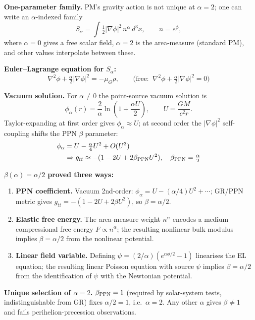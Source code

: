 \documentclass[10pt,twocolumn]{article}
\begin{document}
\textbf{One-parameter family.}
PM's gravity action is not unique at $\alpha=2$; one can write an
$\alpha$-indexed family
\[
  S_\alpha = \int \tfrac{1}{2}|\nabla\phi|^2\, n^\alpha\, d^3x,
  \qquad n=e^\phi,
\]
where $\alpha=0$ gives a free scalar field, $\alpha=2$ is the area-measure
(standard PM), and other values interpolate between these.

\textbf{Euler--Lagrange equation for $S_\alpha$:}
\[
  \nabla^2\phi + \tfrac{\alpha}{2}|\nabla\phi|^2 = -\mu_G\rho, \qquad
  \text{(free: }\ \nabla^2\phi + \tfrac{\alpha}{2}|\nabla\phi|^2 = 0\text{)}
\]

\textbf{Vacuum solution.}
For $\alpha\neq 0$ the point-source vacuum solution is
\[
  \phi_\alpha(r) = \frac{2}{\alpha}\ln\!\left(1+\frac{\alpha U}{2}\right),
  \qquad U = \frac{GM}{c^2 r}.
\]
Taylor-expanding at first order gives $\phi_\alpha \approx U$; at second order
the $|\nabla\phi|^2$ self-coupling shifts the PPN $\beta$ parameter:
\begin{align*}
  \phi_\alpha &= U - \tfrac{\alpha}{4}U^2 + O(U^3) \\
  &\Rightarrow g_{tt} \approx -(1 - 2U + 2\beta_{\rm PPN}U^2),
  \quad \beta_{\rm PPN} = \tfrac{\alpha}{2}
\end{align*}

\textbf{$\beta(\alpha) = \alpha/2$ proved three ways:}
\begin{enumerate}
  \item[(A)] \textbf{PPN coefficient.} Vacuum 2nd-order: $\phi_\alpha = U - (\alpha/4)U^2+\cdots$;
        GR/PPN metric gives $g_{tt}=-(1-2U+2\beta U^2)$, so $\beta=\alpha/2$.
  \item[(B)] \textbf{Elastic free energy.} The area-measure weight $n^\alpha$ encodes
        a medium compressional free energy $F\propto n^\alpha$; the resulting
        nonlinear bulk modulus implies $\beta=\alpha/2$ from the nonlinear potential.
  \item[(C)] \textbf{Linear field variable.} Defining $\psi=(2/\alpha)(e^{\alpha\phi/2}-1)$
        linearises the EL equation; the resulting linear Poisson equation with
        source $\psi$ implies $\beta=\alpha/2$ from the identification of $\psi$ with
        the Newtonian potential.
\end{enumerate}

\textbf{Unique selection of $\alpha=2$.}
$\beta_{\rm PPN}=1$ (required by solar-system tests, indistinguishable from GR)
fixes $\alpha/2=1$, i.e.\ $\alpha=2$.  Any other $\alpha$ gives $\beta\neq 1$
and fails perihelion-precession observations.
\end{document}
